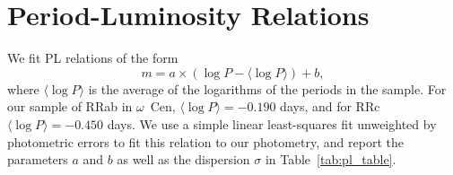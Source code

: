 \documentclass[a4paper,fleqn,usenatbib]{mnras}
\newcommand{\ocen}{$\omega$~Cen\xspace}
\begin{document}

\section{Period-Luminosity Relations}
\label{sec:pl_relation}

We fit PL relations of the form \begin{equation}
\label{eqn:pl}
m = a \times (\log P - \langle \log P \rangle) + b,
\end{equation}
where $\langle \log P \rangle$ is the average of the logarithms of the periods in the sample. For our sample of RRab in \ocen, $\langle \log P \rangle = -0.190$ days, and for RRc $\langle \log P \rangle = -0.450$ days. We use a simple linear least-squares fit unweighted by photometric errors to fit this relation to our photometry, and report the parameters $a$ and $b$ as well as the dispersion $\sigma$ in Table~\ref{tab:pl_table}.
\end{document}
